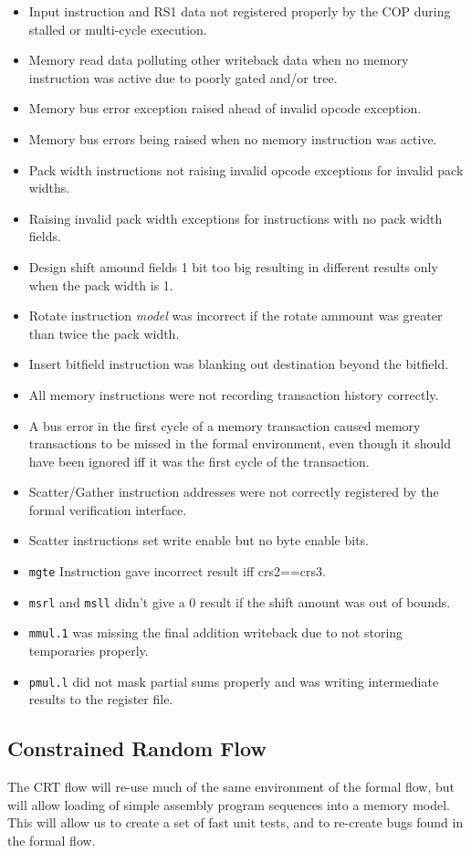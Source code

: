 \begin{itemize}
\item Input instruction and RS1 data not registered properly by the COP during
    stalled or multi-cycle execution.
\item Memory read data polluting other writeback data when no memory
    instruction was active due to poorly gated and/or tree.
\item Memory bus error exception raised ahead of invalid opcode exception.
\item Memory bus errors being raised when no memory instruction was active.
\item Pack width instructions not raising invalid opcode exceptions for
    invalid pack widths.
\item Raising invalid pack width exceptions for instructions with no pack width
    fields.
\item Design shift amound fields 1 bit too big resulting in different results
    only when the pack width is 1.
\item Rotate instruction {\em model} was incorrect if the rotate ammount was
    greater than twice the pack width.
\item Insert bitfield instruction was blanking out destination beyond the
    bitfield.
\item All memory instructions were not recording transaction history correctly.
\item A bus error in the first cycle of a memory transaction caused memory
    transactions to be missed in the formal environment, even though it
    should have been ignored iff it was the first cycle of the transaction.
\item Scatter/Gather instruction addresses were not correctly registered
    by the formal verification interface.
\item Scatter instructions set write enable but no byte enable bits.
\item {\tt mgte} Instruction gave incorrect result iff crs2==crs3.
\item {\tt msrl} and {\tt msll} didn't give a 0 result if the shift
    amount was out of bounds.
\item {\tt mmul.1} was missing the final addition writeback due to not
    storing temporaries properly.
\item {\tt pmul.l} did not mask partial sums properly and was writing
    intermediate results to the register file.
\end{itemize}

\subsection{Constrained Random Flow}

The CRT flow will re-use much of the same environment of the formal flow,
but will allow loading of simple assembly program sequences into a
memory model. This will allow us to create a set of fast unit tests, and to
re-create bugs found in the formal flow.

